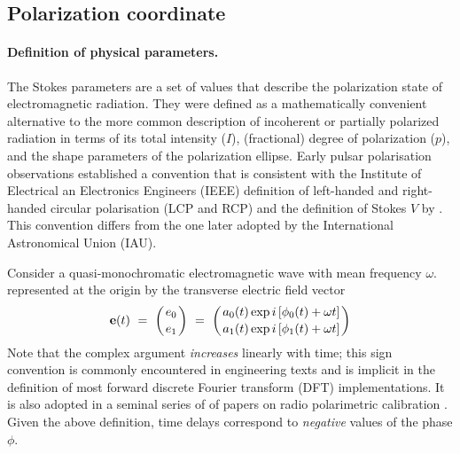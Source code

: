 \documentclass[a4paper,10pt,bibtotoc]{scrreprt}
\begin{document}

\subsection{Polarization coordinate}
\label{sec:coord-polarization}

\paragraph{Definition of physical parameters.}

The Stokes parameters are a set of values that describe the
polarization state of electromagnetic radiation. They were defined as
a mathematically convenient alternative to the more common description
of incoherent or partially polarized radiation in terms of its total
intensity ($I$), (fractional) degree of polarization ($p$), and the shape
parameters of the polarization ellipse. Early pulsar polarisation
observations established a convention that is consistent with the
Institute of Electrical an Electronics Engineers (IEEE) definition of
left-handed and right-handed circular polarisation (LCP and RCP) and
the definition of Stokes $V$ by \cite{kraus.1966}. This convention
differs from the one later adopted by the International Astronomical
Union (IAU).

Consider a quasi-monochromatic electromagnetic wave with mean
frequency $\omega$. represented at the origin by the transverse
electric field vector
\begin{equation}
  \label{eq:2}
  \vec{e}(t) \ = \ \left( e_{0} \atop e_{1} \right) \ = \ 
  \left( a_{0}(t) \exp i \left[ \phi_{0}(t) + \omega t \right] \atop 
    a_{1}(t) \exp i \left[ \phi_{1}(t) + \omega t \right] \right)
\end{equation}
Note that the complex argument \textsl{increases} linearly with time;
this sign convention is commonly encountered in engineering texts
\cite{bracewell.1999,kraus.1966,papoulis.1962} and is implicit in
the definition of most forward discrete Fourier transform (DFT)
implementations. It is also adopted in a seminal series of of papers
on radio polarimetric calibration \cite{polarimetry.paper1,
  polarimetry.paper2, polarimetry.paper3}. Given the above definition, time
delays correspond to \textsl{negative} values of the phase $\phi$.
\end{document}
